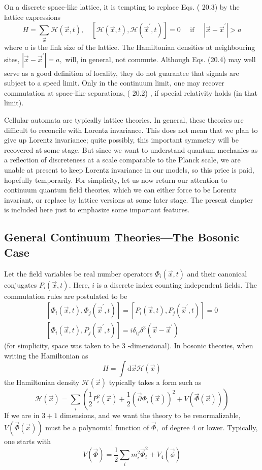 \documentclass[main.tex]{subfiles}
\begin{document}
On a discrete space-like lattice, it is tempting to replace Eqs. ( 20.3) by the lattice expressions
$$
H=\sum_{\vec{x}} \mathcal{H}(\vec{x}, t), \quad\left[\mathcal{H}(\vec{x}, t), \mathcal{H}\left(\vec{x}^{\prime}, t\right)\right]=0 \quad \text { if } \quad\left|\vec{x}-\vec{x}^{\prime}\right|>a
$$
where $a$ is the link size of the lattice. The Hamiltonian densities at neighbouring sites, $\left|\vec{x}-\vec{x}^{\prime}\right|=a,$ will, in general, not commute. Although Eqs. (20.4) may well serve as a good definition of locality, they do not guarantee that signals are subject to a speed limit. Only in the continuum limit, one may recover commutation at space-like separations, ( 20.2) , if special relativity holds (in that limit).

Cellular automata are typically lattice theories. In general, these theories are difficult to reconcile with Lorentz invariance. This does not mean that we plan to give up Lorentz invariance; quite possibly, this important symmetry will be recovered at some stage. But since we want to understand quantum mechanics as a reflection of discreteness at a scale comparable to the Planck scale, we are unable at present to keep Lorentz invariance in our models, so this price is paid, hopefully temporarily. For simplicity, let us now return our attention to continuum quantum field theories, which we can either force to be Lorentz invariant, or replace by lattice versions at some later stage. The present chapter is included here just to emphasize some important features.




\subsection{General Continuum Theories—The Bosonic Case}\label{ch20.1}

Let the field variables be real number operators $\Phi_{i}(\vec{x}, t)$ and their canonical conjugates $P_{i}(\vec{x}, t) .$ Here, $i$ is a discrete index counting independent fields. The commutation rules are postulated to be
$$
\begin{array}{l}
{\left[\Phi_{i}(\vec{x}, t), \Phi_{j}\left(\vec{x}^{\prime}, t\right)\right]=\left[P_{i}(\vec{x}, t), P_{j}\left(\vec{x}^{\prime}, t\right)\right]=0} \\
{\left[\Phi_{i}(\vec{x}, t), P_{j}\left(\vec{x}^{\prime}, t\right)\right]=i \delta_{i j} \delta^{3}\left(\vec{x}-\vec{x}^{\prime}\right)}
\end{array}
$$
(for simplicity, space was taken to be 3 -dimensional). In bosonic theories, when writing the Hamiltonian as
$$
H=\int \mathrm{d} \vec{x} \mathcal{H}(\vec{x})
$$
the Hamiltonian density $\mathcal{H}(\vec{x})$ typically takes a form such as
$$
\mathcal{H}(\vec{x})=\sum_{i}\left(\frac{1}{2} P_{i}^{2}(\vec{x})+\frac{1}{2}\left(\vec{\partial} \Phi_{i}(\vec{x})\right)^{2}+V(\vec{\Phi}(\vec{x}))\right)
$$
If we are in $3+1$ dimensions, and we want the theory to be renormalizable, $V(\vec{\Phi}(\vec{x}))$ must be a polynomial function of $\vec{\Phi},$ of degree 4 or lower. Typically, one starts with
$$
V(\vec{\Phi})=\frac{1}{2} \sum_{i} m_{i}^{2} \vec{\Phi}_{i}^{2}+V_{4}(\vec{\phi})
$$
\end{document}
